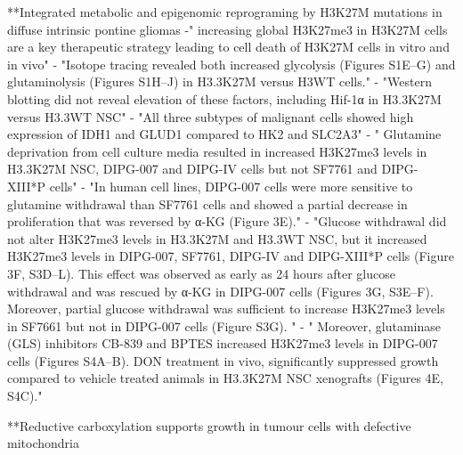 \documentclass[11pt,a4paper]{article}
\begin{document}
**Integrated metabolic and epigenomic reprograming by H3K27M mutations in diffuse intrinsic pontine gliomas
-" increasing global H3K27me3 in H3K27M cells are a key therapeutic strategy leading to cell death of H3K27M cells in vitro and in vivo"
- "Isotope tracing revealed both increased glycolysis (Figures S1E–G) and glutaminolysis (Figures S1H–J) in H3.3K27M versus H3WT cells."
- "Western blotting did not reveal elevation of these factors, including Hif-1α in H3.3K27M versus H3.3WT NSC"
- "All three subtypes of malignant cells showed high expression of IDH1 and GLUD1 compared to HK2 and SLC2A3"
- " Glutamine deprivation from cell culture media resulted in increased H3K27me3 levels in H3.3K27M NSC, DIPG-007 and DIPG-IV cells but not SF7761 and DIPG-XIII*P cells"
- "In human cell lines, DIPG-007 cells were more sensitive to glutamine withdrawal than SF7761 cells and showed a partial decrease in proliferation that was reversed by α-KG (Figure 3E)."
 - "Glucose withdrawal did not alter H3K27me3 levels in H3.3K27M and H3.3WT NSC, but it increased H3K27me3 levels in DIPG-007, SF7761, DIPG-IV and DIPG-XIII*P cells (Figure 3F, S3D–L). This effect was observed as early as 24 hours after glucose withdrawal and was rescued by α-KG in DIPG-007 cells (Figures 3G, S3E–F). Moreover, partial glucose withdrawal was sufficient to increase H3K27me3 levels in SF7661 but not in DIPG-007 cells (Figure S3G). "
 - " Moreover, glutaminase (GLS) inhibitors CB-839 and BPTES increased H3K27me3 levels in DIPG-007 cells (Figures S4A–B). DON treatment in vivo, significantly suppressed growth compared to vehicle treated animals in H3.3K27M NSC xenografts (Figures 4E, S4C)."
 
**Reductive carboxylation supports growth in tumour cells with defective mitochondria
\end{document}
